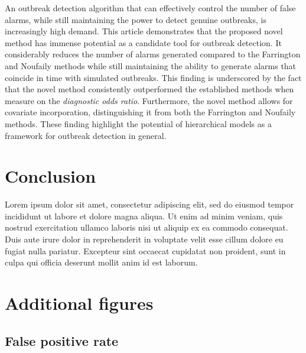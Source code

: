 \documentclass[preprint, 3p, authoryear]{elsarticle} %
\begin{document}
An outbreak detection algorithm that can effectively control the number of false alarms, while still maintaining the power to detect genuine outbreaks, is increasingly high demand. This article demonstrates that the proposed novel method has immense potential as a candidate tool for outbreak detection. It considerably reduces the number of alarms generated compared to the Farrington and Noufaily methods while still maintaining the ability to generate alarms that coincide in time with simulated outbreaks. This finding is underscored by the fact that the novel method consistently outperformed the established methods when measure on the \emph{diagnostic odds ratio}. Furthermore, the novel method allows for covariate incorporation, distinguishing it from both the Farrington and Noufaily methods. These finding highlight the potential of hierarchical models as a framework for outbreak detection in general.

\hypertarget{conclusion}{%
\section{Conclusion}\label{conclusion}}

Lorem ipsum dolor sit amet, consectetur adipiscing elit, sed do eiusmod tempor incididunt ut labore et dolore magna aliqua. Ut enim ad minim veniam, quis nostrud exercitation ullamco laboris nisi ut aliquip ex ea commodo consequat. Duis aute irure dolor in reprehenderit in voluptate velit esse cillum dolore eu fugiat nulla pariatur. Excepteur sint occaecat cupidatat non proident, sunt in culpa qui officia deserunt mollit anim id est laborum.

\newpage

\appendix

\hypertarget{additional-figures}{%
\section{Additional figures}\label{additional-figures}}

\hypertarget{false-positive-rate-1}{%
\subsection{False positive rate}\label{false-positive-rate-1}}
\end{document}
